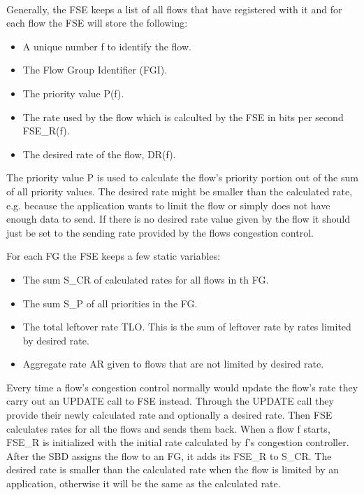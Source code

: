 \paragraph{}
Generally, the FSE keeps a list of all flows that have registered with it and for each flow the FSE will store the following:
\begin{itemize}
    \item A unique number f to identify the flow.
    \item The Flow Group Identifier (FGI).
    \item The priority value P(f).
    \item The rate used by the flow which is calculted by the FSE in bits per second FSE\_R(f).
    \item The desired rate of the flow, DR(f).
\end{itemize}

The priority value P is used to calculate the flow's priority portion out of the sum of all priority values.
The desired rate might be smaller than the calculated rate, e.g. because the application wants to limit the flow or simply does not have enough data to send. 
If there is no desired rate value given by the flow it should just be set to the sending rate provided by the flows congestion control.

For each FG the FSE keeps a few static variables:
\begin{itemize}
    \item The sum S\_CR of calculated rates for all flows in th FG.
    \item The sum S\_P of all priorities in the FG.
    \item The total leftover rate TLO. This is the sum of leftover rate by rates limited by desired rate.
    \item Aggregate rate AR given to flows that are not limited by desired rate. 
\end{itemize}

Every time a flow's congestion control normally would update the flow's rate they carry out an UPDATE call to FSE instead. 
Through the UPDATE call they provide their newly calculated rate and optionally a desired rate. 
Then FSE calculates rates for all the flows and sends them back. 
When a flow f starts, FSE\_R is initialized with the initial rate calculated by f's congestion controller. 
After the SBD assigns the flow to an FG, it adds its FSE\_R to S\_CR.
The desired rate is smaller than the calculated rate when the flow is limited by an application, otherwise it will be the same as the calculated rate.

